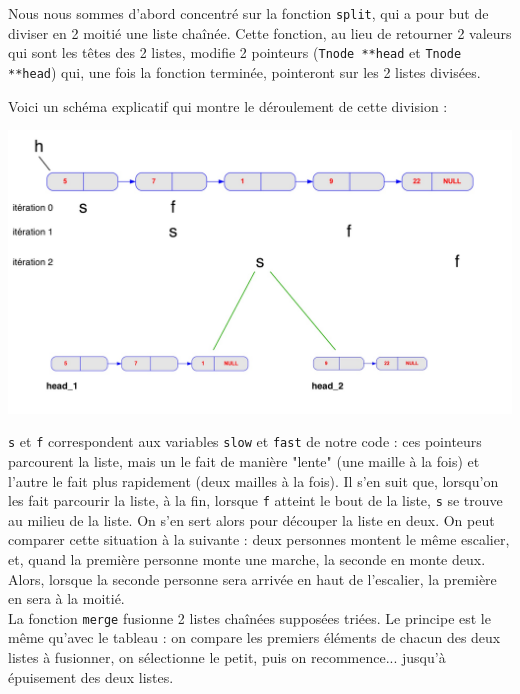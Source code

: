 \documentclass[11pt]{article}
\begin{document}
Nous nous sommes d'abord concentré sur la fonction \texttt{split}, qui a pour but de diviser en 2 moitié une liste chaînée. Cette fonction, au lieu de retourner 2 valeurs qui sont les têtes des 2 listes, modifie 2 pointeurs (\texttt{T\textunderscore node **head} et \texttt{T\textunderscore node **head}) qui, une fois la fonction terminée, pointeront sur les 2 listes divisées.

Voici un schéma explicatif qui montre le déroulement de cette division : 

\begin{center}
\includegraphics[scale=0.25]{images/2.jpg}
\end{center}

\texttt{s} et \texttt{f} correspondent aux variables \texttt{slow} et \texttt{fast} de notre code : ces pointeurs parcourent la liste, mais un le fait de manière "lente" (une maille à la fois) et l'autre le fait plus rapidement (deux mailles à la fois). Il s'en suit que, lorsqu'on les fait parcourir la liste, à la fin, lorsque \texttt{f} atteint le bout de la liste, \texttt{s} se trouve au milieu de la liste. On s'en sert alors pour découper la liste en deux. On peut comparer cette situation à la suivante : deux personnes montent le même escalier, et, quand la première personne monte une marche, la seconde en monte deux. Alors, lorsque la seconde personne sera arrivée en haut de l'escalier, la première en sera à la moitié. \\


La fonction \texttt{merge} fusionne 2 listes chaînées supposées triées. Le principe est le même qu'avec le tableau : on compare les premiers éléments de chacun des deux listes à fusionner, on sélectionne le petit, puis on recommence... jusqu'à épuisement des deux listes. \\
\end{document}
